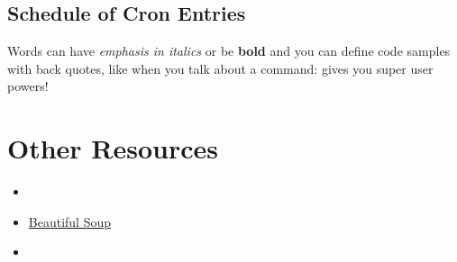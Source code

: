 \documentclass[letterpaper,10pt,english]{sphinxmanual}
\begin{document}
\section{Schedule of Cron Entries}
\label{_static/howto:schedule-of-cron-entries}
Words can have \emph{emphasis in italics} or be \textbf{bold} and you can define
code samples with back quotes, like when you talk about a command: 
gives you super user powers!


\chapter{Other Resources}
\label{index:other-resources}\begin{itemize}
\item {} 

\item {} 
\href{http://www.crummy.com/software/BeautifulSoup/bs4/doc/}{Beautiful Soup}

\item {} 

\end{itemize}



\renewcommand{\indexname}{Index}
\printindex
\end{document}
